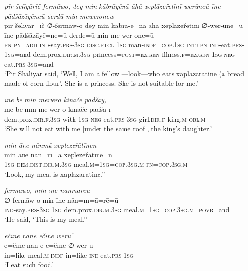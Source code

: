 \ea \label{ŽP.210}
\textit{pīr šelīyārīč fermāwo, dey min kābrāyēnā āhā xeplāzeřetīnī werūneū īne pādšāzāyēneū derdū min meweronew} \\ 
\gll pīr šelīyār=īč ∅-fermāw-o dey min kābrā-ē=nā āhā xeplāzeřetīnī ∅-wer-ūne=ū īne pādšāzāyē=ne=ū derde=ū min me-wer-one=ū \\ 
 \textsc{pn} \textsc{pn}\textsc{=add} \textsc{ind-}say\textsc{.prs}\textsc{-3sg} \textsc{disc.ptcl} \textsc{1sg} man\textsc{-indf}\textsc{=cop}\textsc{.\textsc{1sg}} \textsc{intj} \textsc{pn} \textsc{ind-}eat\textsc{.prs}\textsc{-\textsc{1sg}}=and dem.prox\textsc{.dir}\textsc{.m}\textsc{.3sg} princess\textsc{=\textsc{post}}\textsc{\textsc{=ez.gen}} illness\textsc{.f}\textsc{\textsc{=ez.gen}} \textsc{1sg} \textsc{neg-}eat\textsc{.prs}\textsc{-3sg}=and \\ 
\glt `Pir Shaliyar said, ‘Well, I am a fellow —look—who eats xaplazaratine (a bread made of corn flour’. She is a princess. She is not suitable for me.'
\z 
 
\ea \label{ŽP.213}
\textit{īnē be min mewero kināčē pādšāy,} \\ 
\gll īnē be min me-wer-o kināčē pādšā-ī \\ 
 dem.prox\textsc{.dir}\textsc{.f}\textsc{.3sg} with \textsc{1sg} \textsc{neg-}eat\textsc{.prs}\textsc{-3sg} girl\textsc{.dir}\textsc{.f} king\textsc{.m}\textsc{-obl}\textsc{.m} \\ 
\glt `She will not eat with me [under the same roof], the king’s daughter.'
\z 
 
\ea \label{ŽP.214}
\textit{min āne nānmā xeplezeřātīnen} \\ 
\gll min āne nān=m=ā xeplezeřātīne=n \\ 
 \textsc{1sg} \textsc{dem.dist}\textsc{.dir}\textsc{.m}\textsc{.3sg} meal\textsc{.m}\textsc{=\textsc{1sg}}\textsc{=cop}\textsc{.3sg}\textsc{.m} \textsc{pn}\textsc{=cop}\textsc{.3sg}\textsc{.m} \\ 
\glt `Look, my meal is xaplazaratine.’'
\z 
 
\ea \label{ŽP.217}
\textit{fermāwo, min īne nānmārēū} \\ 
\gll ∅-fermāw-o min īne nān=m=ā=rē=ū \\ 
 \textsc{ind-}say\textsc{.prs}\textsc{-3sg} \textsc{1sg} dem.prox\textsc{.dir}\textsc{.m}\textsc{.3sg} meal\textsc{.m}\textsc{=\textsc{1sg}}\textsc{=cop}\textsc{.3sg}\textsc{.m}\textsc{=\textsc{povb}}=and \\ 
\glt `He said, ‘This is my meal.’'
\z 
 
\ea \label{ŽP.218}
\textit{ečīne nānē ečīne werū’} \\ 
\gll e=čīne nān-ē e=čīne ∅-wer-ū \\ 
 in=like meal\textsc{.m}\textsc{-indf} in=like \textsc{ind-}eat\textsc{.prs}\textsc{-\textsc{1sg}} \\ 
\glt `I eat such food.'
\z 
 
